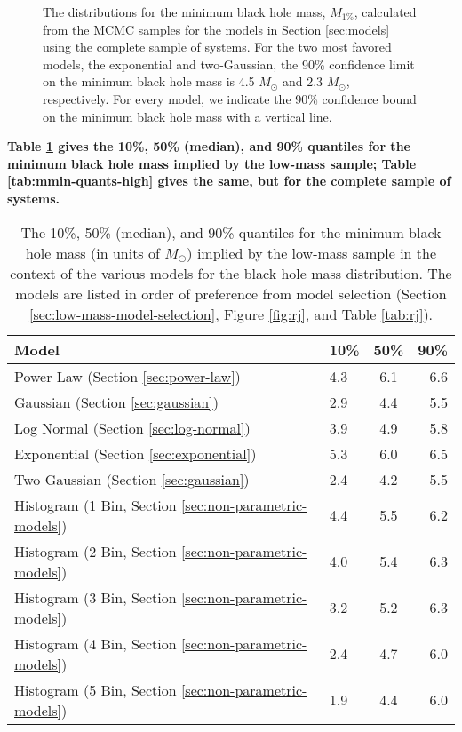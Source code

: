 \documentclass[preprint]{aastex}
\newcommand{\Msun}{M_\odot}
\newcommand{\changed}[1]{{\bf #1 }}
\begin{document}
\begin{figure}
\begin{center}
  \end{center}
  \caption{\label{fig:high-min-mass} The distributions for the minimum
    black hole mass, $M_{1\%}$, calculated from the MCMC samples for
    the models in Section \ref{sec:models} using the complete sample
    of systems.  For the two most favored models, the exponential and
    two-Gaussian, the 90\% confidence limit on the minimum black hole
    mass is 4.5 $\Msun$ and 2.3 $\Msun$, respectively.  For every
    model, we indicate the 90\% confidence bound on the minimum black
    hole mass with a vertical line.}
\end{figure}

\changed{Table \ref{tab:mmin-quants} gives the 10\%, 50\% (median),
  and 90\% quantiles for the minimum black hole mass implied by the
  low-mass sample; Table \ref{tab:mmin-quants-high} gives the same,
  but for the complete sample of systems.}

\begin{table}
  \begin{center}
    \begin{tabular}{|l|l|c|r|}
      \hline
      Model & 10\% & 50\% & 90\% \\
      \hline \hline
      Power Law (Section \ref{sec:power-law}) & 4.3 & 6.1 & 6.6 \\
      \hline
      Gaussian (Section \ref{sec:gaussian}) & 2.9 & 4.4 & 5.5 \\
      \hline 
      Log Normal (Section \ref{sec:log-normal}) & 3.9 & 4.9 & 5.8 \\
      \hline 
      Exponential (Section \ref{sec:exponential}) & 5.3 & 6.0 & 6.5 \\
      \hline 
      Two Gaussian (Section \ref{sec:gaussian}) & 2.4 & 4.2 & 5.5 \\
      \hline 
      Histogram (1 Bin, Section \ref{sec:non-parametric-models}) & 4.4 & 5.5 & 6.2 \\
      \hline
      Histogram (2 Bin, Section \ref{sec:non-parametric-models}) & 4.0 & 5.4 & 6.3 \\
      \hline 
      Histogram (3 Bin, Section \ref{sec:non-parametric-models}) & 3.2 & 5.2 & 6.3 \\
      \hline
      Histogram (4 Bin, Section \ref{sec:non-parametric-models}) & 2.4 & 4.7 & 6.0 \\
      \hline
      Histogram (5 Bin, Section \ref{sec:non-parametric-models}) & 1.9 & 4.4 & 6.0 \\
      \hline
    \end{tabular}
  \end{center}
  \caption{\label{tab:mmin-quants} The 10\%, 50\% (median), and 90\% quantiles for the minimum black hole mass (in units of $\Msun$) implied by the low-mass sample in the context of the various models for the black hole mass distribution.  The models are listed in order of preference from model selection (Section \ref{sec:low-mass-model-selection}, Figure \ref{fig:rj}, and Table \ref{tab:rj}).}
\end{table}
\end{document}
